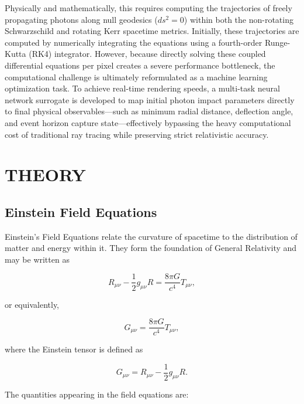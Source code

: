 \documentclass[12pt]{article}
\begin{document}
Physically and mathematically, this requires computing the trajectories of freely propagating photons along null geodesics ($ds^{2}=0$) within both the non-rotating Schwarzschild and rotating Kerr spacetime metrics. Initially, these trajectories are computed by numerically integrating the equations using a fourth-order Runge-Kutta (RK4) integrator. However, because directly solving these coupled differential equations per pixel creates a severe performance bottleneck, the computational challenge is ultimately reformulated as a machine learning optimization task. To achieve real-time rendering speeds, a multi-task neural network surrogate is developed to map initial photon impact parameters directly to final physical observables—such as minimum radial distance, deflection angle, and event horizon capture state—effectively bypassing the heavy computational cost of traditional ray tracing while preserving strict relativistic accuracy.
\newpage
\section{\textbf{THEORY}}
\subsection{Einstein Field Equations}

Einstein's Field Equations relate the curvature of spacetime to the distribution of matter and energy within it. They form the foundation of General Relativity and may be written as

\begin{equation}
R_{\mu\nu} - \frac{1}{2}g_{\mu\nu}R
=
\frac{8\pi G}{c^4}T_{\mu\nu},
\end{equation}

or equivalently,

\begin{equation}
G_{\mu\nu}
=
\frac{8\pi G}{c^4}T_{\mu\nu},
\end{equation}

where the Einstein tensor is defined as

\begin{equation}
G_{\mu\nu}
=
R_{\mu\nu}
-
\frac{1}{2}g_{\mu\nu}R.
\end{equation}

The quantities appearing in the field equations are:
\end{document}
